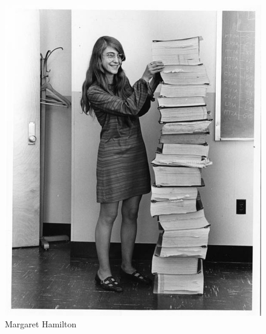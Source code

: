 \documentclass[a4paper,12pt]{article}
\begin{document}
    \begin{figure}[h]
    \centering
    \includegraphics[width = .6\textwidth]{margaret_hamilton5.jpg}
    \caption{Margaret Hamilton}
    \label{fig:my_label}
\end{figure}
\end{document}
